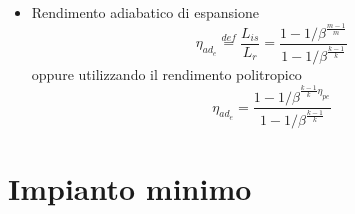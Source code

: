 \documentclass[a4paper,12pt]{article}
\begin{document}
\begin{itemize}
   \item Rendimento adiabatico di espansione
   \begin{equation}
        \label{eq:rendimento_adiabatico}
        \eta_{ad_e} \stackrel{def}{=} \frac{L_{is}}{L_r} = \frac{1-1/\beta^{\frac{m-1}{m}}}
        {1-1/\beta^{\frac{k-1}{k}}}
   \end{equation}
   oppure utilizzando il rendimento politropico
   \begin{equation}
        \label{eq:rendimento_adiabatico_con_rendimento_politropico}
        \eta_{ad_e} = \frac{1-1/\beta^{\frac{k-1}{k}\eta_{pe}}}
        {1-1/\beta^{\frac{k-1}{k}}}
   \end{equation}
\end{itemize}


\section{Impianto minimo}
\label{sec:primo_impianto}
\end{document}
